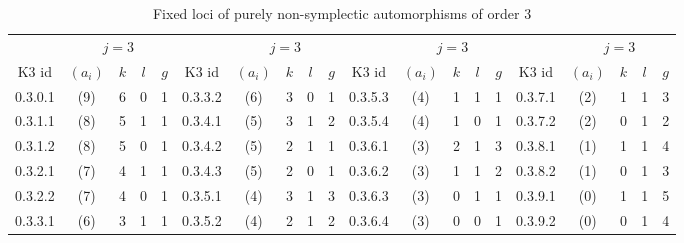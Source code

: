 {\small\centering\setlength{\tabcolsep}{3pt}
\begin{longtable}{ccccc|ccccc|ccccc|ccccc}
\caption{Fixed loci of purely non-symplectic automorphisms of order 3}\\
 & \multicolumn{4}{c}{$j = 3$} & & \multicolumn{4}{c}{$j = 3$} & & \multicolumn{4}{c}{$j = 3$} & & \multicolumn{4}{c}{$j = 3$}\\
\cmidrule(lr){2-5}
\cmidrule(lr){7-10}
\cmidrule(lr){12-15}
\cmidrule(lr){17-20}
K3 id & $(a_i)$ & $k$ & $l$ & $g$ & K3 id & $(a_i)$ & $k$ & $l$ & $g$ & K3 id & $(a_i)$ & $k$ & $l$ & $g$ & K3 id & $(a_i)$ & $k$ & $l$ & $g$\\
\hline
\endhead
\rowcolor{lightgray}
0.3.0.1 & (9) & 6 & 0 & 1 & 0.3.3.2 & (6) & 3 & 0 & 1 & 0.3.5.3 & (4) & 1 & 1 & 1 & 0.3.7.1 & (2) & 1 & 1 & 3\\
0.3.1.1 & (8) & 5 & 1 & 1 & 0.3.4.1 & (5) & 3 & 1 & 2 & 0.3.5.4 & (4) & 1 & 0 & 1 & 0.3.7.2 & (2) & 0 & 1 & 2\\
\rowcolor{lightgray}
0.3.1.2 & (8) & 5 & 0 & 1 & 0.3.4.2 & (5) & 2 & 1 & 1 & 0.3.6.1 & (3) & 2 & 1 & 3 & 0.3.8.1 & (1) & 1 & 1 & 4\\
0.3.2.1 & (7) & 4 & 1 & 1 & 0.3.4.3 & (5) & 2 & 0 & 1 & 0.3.6.2 & (3) & 1 & 1 & 2 & 0.3.8.2 & (1) & 0 & 1 & 3\\
\rowcolor{lightgray}
0.3.2.2 & (7) & 4 & 0 & 1 & 0.3.5.1 & (4) & 3 & 1 & 3 & 0.3.6.3 & (3) & 0 & 1 & 1 & 0.3.9.1 & (0) & 1 & 1 & 5\\
0.3.3.1 & (6) & 3 & 1 & 1 & 0.3.5.2 & (4) & 2 & 1 & 2 & 0.3.6.4 & (3) & 0 & 0 & 1 & 0.3.9.2 & (0) & 0 & 1 & 4\\
\hline\end{longtable}
}
